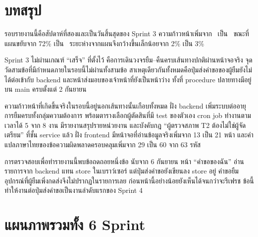 \section{บทสรุป}

รอบรายงานนี้คือสัปดาห์ที่สองและเป็นวันสิ้นสุดของ Sprint 3 ความก้าวหน้าเพิ่มจาก \prevactualpct\ เป็น \actualpct\ ขณะที่แผนขยับจาก 72\% เป็น \planpct\ ระยะห่างจากแผนจึงกว้างขึ้นเล็กน้อยจาก 2\% เป็น 3\%

Sprint 3 ไม่ผ่านเกณฑ์ ``เสร็จ'' ที่ตั้งไว้ คือการเดินวงจรยืม–คืนครบเส้นทางปกติผ่านหน้าจอจริง จุดวัดสามข้อที่มีกำหนดภายในรอบนี้ไม่ผ่านทั้งสามข้อ สาเหตุเดียวกันทั้งหมดคือปุ่มส่งคำขอของผู้ยืมยังไม่ได้ต่อเข้ากับ backend และหน้าส่งมอบของเจ้าหน้าที่ยังเป็นหน้าว่าง ทั้งที่ procedure ปลายทางมีอยู่บน main ครบตั้งแต่ 2 กันยายน

ความก้าวหน้าที่เกิดขึ้นจริงในรอบนี้อยู่นอกเส้นทางนั้นเกือบทั้งหมด ฝั่ง backend เพิ่มระบบต่ออายุการยืมครบทั้งกลุ่มความต้องการ พร้อมตารางเลือกผู้ตัดสินที่มี test ของตัวเอง cron job ทำงานตามเวลาได้ 5 จาก 8 งาน มีรายงานสรุปรายหน่วยงาน และบังคับกฎ ``ผู้ตรวจสภาพ T2 ต้องไม่ใช่ผู้จัดเตรียม'' ที่ชั้น service แล้ว ฝั่ง frontend มีหน้าจอที่อ่านข้อมูลจริงเพิ่มจาก 13 เป็น 21 หน้า และคำแปลภาษาไทยของข้อความผิดพลาดครอบคลุมเพิ่มจาก 29 เป็น 60 จาก 63 รหัส

การตรวจสอบเพื่อทำรายงานนี้พบข้อถดถอยหนึ่งข้อ นับจาก 6 กันยายน หน้า ``คำขอของฉัน'' อ่านรายการจาก backend แทน store ในเบราว์เซอร์ แต่ปุ่มส่งคำขอยังเขียนลง store อยู่ คำขอยืมอุปกรณ์ที่ผู้ยืมเพิ่งกดส่งจึงไม่ปรากฏในรายการเลย ก่อนหน้านี้อย่างน้อยยังเห็นได้จนกว่าจะรีเฟรช ข้อนี้ทำให้งานต่อปุ่มส่งคำขอเป็นงานลำดับแรกของ Sprint 4

\section{แผนภาพรวมทั้ง 6 Sprint}
\label{sec:overview}

